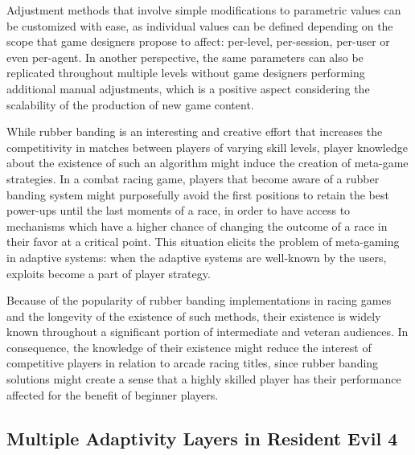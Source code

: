 Adjustment methods that involve simple modifications to parametric values can be customized with ease, as individual values can be defined depending on the scope that game designers propose to affect: per-level, per-session, per-user or even per-agent. In another perspective, the same parameters can also be replicated throughout multiple levels without game designers performing additional manual adjustments, which is a positive aspect considering the scalability of the production of new game content.


While rubber banding is an interesting and creative effort that increases the competitivity in matches between players of varying skill levels, player knowledge about the existence of such an algorithm might induce the creation of meta-game strategies. In a combat racing game, players that become aware of a rubber banding system might purposefully avoid the first positions to retain the best power-ups until the last moments of a race, in order to have access to mechanisms which have a higher chance of changing the outcome of a race in their favor at a critical point. This situation elicits the problem of meta-gaming in adaptive systems: when the adaptive systems are well-known by the users, exploits become a part of player strategy.

Because of the popularity of rubber banding implementations in racing games and the longevity of the existence of such methods, their existence is widely known throughout a significant portion of intermediate and veteran audiences. In consequence, the knowledge of their existence might reduce the interest of competitive players in relation to arcade racing titles, since rubber banding solutions might create a sense that a highly skilled player has their performance affected for the benefit of beginner players.

\subsection{Multiple Adaptivity Layers in Resident Evil 4}

